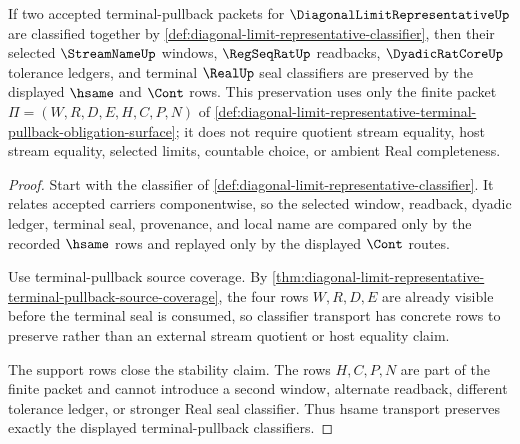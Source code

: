 \begin{theorem}
\label{thm:diagonal-limit-representative-terminal-pullback-classifier-stability}
If two accepted terminal-pullback packets for $\DiagonalLimitRepresentativeUp$ are classified together by \autoref{def:diagonal-limit-representative-classifier}, then their selected $\StreamNameUp$ windows, $\RegSeqRatUp$ readbacks, $\DyadicRatCoreUp$ tolerance ledgers, and terminal $\RealUp$ seal classifiers are preserved by the displayed $\hsame$ and $\Cont$ rows. This preservation uses only the finite packet $\Pi=(W,R,D,E,H,C,P,N)$ of \autoref{def:diagonal-limit-representative-terminal-pullback-obligation-surface}; it does not require quotient stream equality, host stream equality, selected limits, countable choice, or ambient Real completeness.
\end{theorem}
\begin{proof}
Start with the classifier of \autoref{def:diagonal-limit-representative-classifier}. It relates accepted carriers componentwise, so the selected window, readback, dyadic ledger, terminal seal, provenance, and local name are compared only by the recorded $\hsame$ rows and replayed only by the displayed $\Cont$ routes.

Use terminal-pullback source coverage. By \autoref{thm:diagonal-limit-representative-terminal-pullback-source-coverage}, the four rows $W,R,D,E$ are already visible before the terminal seal is consumed, so classifier transport has concrete rows to preserve rather than an external stream quotient or host equality claim.

The support rows close the stability claim. The rows $H,C,P,N$ are part of the finite packet and cannot introduce a second window, alternate readback, different tolerance ledger, or stronger Real seal classifier. Thus hsame transport preserves exactly the displayed terminal-pullback classifiers.
\end{proof}

